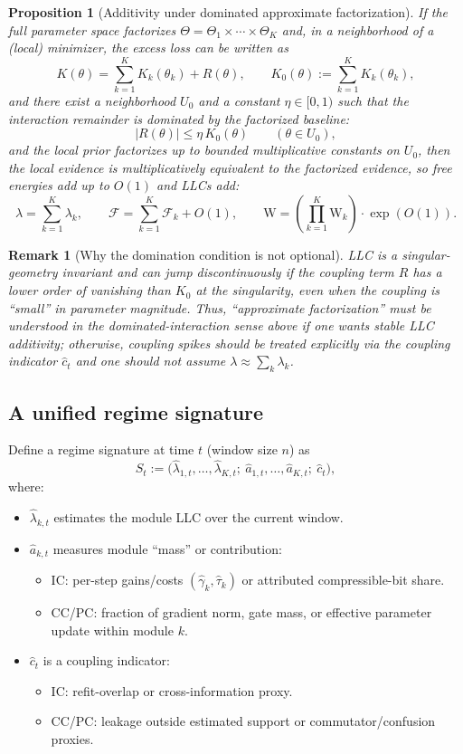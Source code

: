 \documentclass[11pt]{article}
\newcommand{\weak}{\mathrm{W}}  %
\newcommand{\Ffree}{\mathcal{F}}%
\newtheorem{proposition}{Proposition}
\newtheorem{remark}{Remark}
\begin{document}
\begin{proposition}[Additivity under dominated approximate factorization]
If the full parameter space factorizes $\Theta=\Theta_1\times\cdots\times\Theta_K$ and, in a neighborhood of a
(local) minimizer, the \emph{excess loss} can be written as
\[
K(\theta) = \sum_{k=1}^K K_k(\theta_k) + R(\theta),
\qquad
K_0(\theta):=\sum_{k=1}^K K_k(\theta_k),
\]
and there exist a neighborhood $U_0$ and a constant $\eta\in[0,1)$ such that the interaction remainder is
\emph{dominated} by the factorized baseline:
\[
|R(\theta)| \le \eta\, K_0(\theta) \qquad (\theta \in U_0),
\]
and the local prior factorizes up to bounded multiplicative constants on $U_0$, then the local evidence is
multiplicatively equivalent to the factorized evidence, so free energies add up to $O(1)$ and LLCs add:
\[
\lambda = \sum_{k=1}^K \lambda_k,
\qquad
\Ffree = \sum_{k=1}^K \Ffree_k + O(1),
\qquad
\weak = \left(\prod_{k=1}^K \weak_k\right)\cdot \exp(O(1)).
\]
\end{proposition}

\begin{remark}[Why the domination condition is not optional]
LLC is a singular-geometry invariant and can jump discontinuously if the coupling term $R$ has a lower order of
vanishing than $K_0$ at the singularity, even when the coupling is ``small'' in parameter magnitude. Thus,
``approximate factorization'' must be understood in the dominated-interaction sense above if one wants stable
LLC additivity; otherwise, coupling spikes should be treated explicitly via the coupling indicator $\hat c_t$ and
one should not assume $\lambda \approx \sum_k \lambda_k$.
\end{remark}

\subsection{A unified regime signature}
Define a regime signature at time $t$ (window size $n$) as
\[
S_t := \big(\hat\lambda_{1,t},\dots,\hat\lambda_{K,t};\ \hat a_{1,t},\dots,\hat a_{K,t};\ \hat c_t\big),
\]
where:
\begin{itemize}
  \item $\hat\lambda_{k,t}$ estimates the module LLC over the current window.
  \item $\hat a_{k,t}$ measures module ``mass'' or contribution:
    \begin{itemize}
      \item IC: per-step gains/costs $(\hat\gamma_k,\hat\tau_k)$ or attributed compressible-bit share.
      \item CC/PC: fraction of gradient norm, gate mass, or effective parameter update within module $k$.
    \end{itemize}
  \item $\hat c_t$ is a coupling indicator:
    \begin{itemize}
      \item IC: refit-overlap or cross-information proxy.
      \item CC/PC: leakage outside estimated support or commutator/confusion proxies.
    \end{itemize}
\end{itemize}
\end{document}
